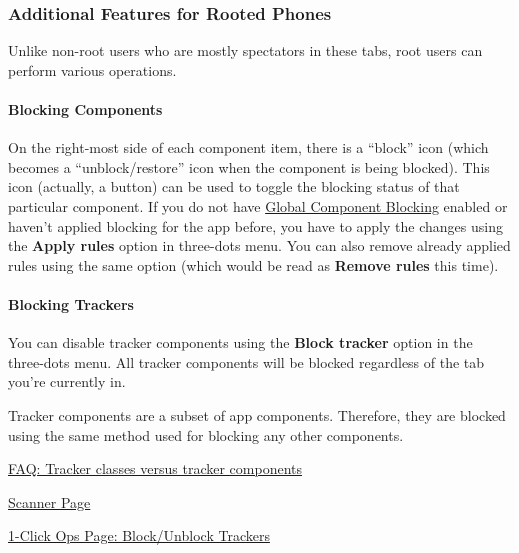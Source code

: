 \subsubsection{Additional Features for Rooted Phones}
Unlike non-root users who are mostly spectators in these tabs, root users can perform various operations.

\paragraph{Blocking Components}
On the right-most side of each component item, there is a ``block'' icon (which becomes a ``unblock/restore'' icon when
the component is being blocked). This icon (actually, a button) can be used to toggle the blocking status of that
particular component. If you do not have \hyperref[subsubsec:instant-component-blocking]{Global Component Blocking}
enabled or haven't applied blocking for the app before, you have to apply the changes using the \textbf{Apply rules}
option in three-dots menu. You can also remove already applied rules using the same option (which would be read as
\textbf{Remove rules} this time).


\paragraph{Blocking Trackers}
\label{par:appdetails:blocking-trackers}
You can disable tracker components using the \textbf{Block tracker} option in the three-dots menu. All tracker
components will be blocked regardless of the tab you're currently in.

\begin{tip}[Info]
    Tracker components are a subset of app components. Therefore, they are blocked using the same method used for
    blocking any other components.
\end{tip}

\begin{amseealso}
    \item \hyperref[subsec:tracker-classes-versus-tracker-components]{FAQ: Tracker classes versus tracker components}
    \item \hyperref[sec:scanner-page]{Scanner Page}
    \item \hyperref[subsec:block-unblock-trackers]{1-Click Ops Page: Block/Unblock Trackers}
\end{amseealso}

